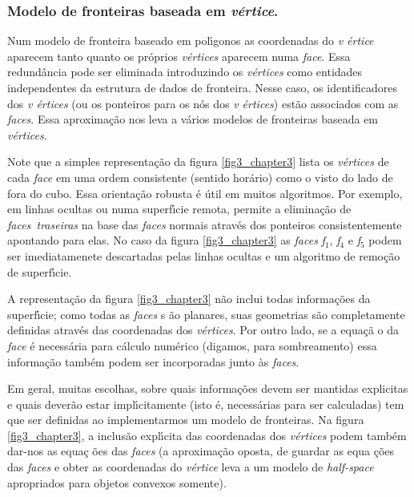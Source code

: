 \documentclass[12pt,a4paper]{book}
\begin{document}
\subsubsection{Modelo de fronteiras baseada em \textit{v\'{e}rtice}.}

Num modelo de fronteira baseado em pol\'{\i}gonos as coordenadas do \textit{v%
\'{e}rtice} aparecem tanto quanto os pr\'{o}prios \textit{v\'{e}rtices}
aparecem numa \textit{face}. Essa redund\^{a}ncia pode ser eliminada 
introduzindo os \textit{v\'{e}rtices} como entidades independentes da
estrutura de dados de fronteira. Nesse caso, os identificadores dos \textit{v%
\'{e}rtices} (ou os ponteiros para os n\'{o}s dos \textit{v%
\'{e}rtices}) est\~{a}o associados com as \textit{faces}. Essa aproxima\c{c}\~{a}o nos leva a v\'{a}rios modelos de fronteiras baseada em \textit{v\'{e}rtices}.

Note que a simples representa\c{c}\~{a}o da figura \ref{fig3_chapter3} lista os 
\textit{v\'{e}rtices} de cada \textit{face} em uma ordem consistente (sentido hor\'{a}rio) como o visto do lado de fora do cubo. Essa orienta\c{c}\~{a}o
robusta \'{e} \'{u}til em muitos algoritmos. Por exemplo, em linhas
ocultas ou numa superf\'{\i}cie remota, permite a elimina\c{c}\~{a}o de 
\textit{faces}\textit{\ traseiras } na base das \textit{faces} normais atrav\'{e}s dos ponteiros consistentemente apontando para elas. No caso da figura \ref{fig3_chapter3}
as \textit{faces} \textit{f}$_{1}$, \textit{f}$_{4}$ e \textit{f}$_{5}$ podem
ser imediatamenete descartadas pelas linhas ocultas e um algoritmo de
remo\c{c}\~{a}o de superf\'{\i}cie.

A representa\c{c}\~{a}o da figura \ref{fig3_chapter3} n\~{a}o inclui
todas informa\c{c}\~{o}es da superf\'{\i}cie; como todas as \textit{faces} s%
\~{a}o planares, suas geometrias s\~{a}o completamente definidas atrav\'{e}s
das coordenadas dos \textit{v\'{e}rtices}. Por outro lado, se a equa\c{c}\~{a}%
o da \textit{face} \'{e} necess\'{a}ria para c\'{a}lculo num\'{e}rico (digamos,
para sombreamento) essa informa\c{c}\~{a}o tamb\'{e}m podem ser 
incorporadas junto \`{a}s \textit{faces}.

Em geral, muitas escolhas, sobre quais informa\c{c}\~{o}es devem ser mantidas
explicitas e quais dever\~{a}o estar impl\'{\i}citamente (isto \'{e}, necess\'{a}rias
para ser calculadas) tem que ser definidas ao implementarmos um modelo de
fronteiras. Na figura \ref{fig3_chapter3}, a inclus\~{a}o expl\'{\i}cita
das coordenadas dos \textit{v\'{e}rtices} podem tamb\'{e}m dar-nos as equa\c{c}%
\~{o}es das \emph{faces} (a aproxima\c{c}\~{a}o oposta, de guardar as equa%
\c{c}\~{o}es das \textit{faces} e obter as coordenadas do \textit{v\'{e}rtice}
leva a um modelo de \textit{half-space }apropriados para objetos convexos
somente).
\end{document}
